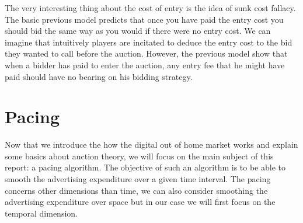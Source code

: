 \documentclass[12pt]{article}
\begin{document}
The very interesting thing about the cost of entry is the idea of sunk cost fallacy. The basic previous model predicts that once you have paid the entry cost you should bid the same way as you would if there were no entry cost. We can imagine that intuitively players are incitated to deduce the entry cost to the bid they wanted to call before the auction. However, the previous model show that when a bidder has paid to enter the auction, any entry fee that he might have paid should have no bearing on his bidding strategy.

\newpage

\section{Pacing}

Now that we introduce the how the digital out of home market works and explain some basics about auction theory, we will focus on the main subject of this report: a pacing algorithm. The objective of such an algorithm is to be able to smooth the advertising expenditure over a given time interval. The pacing concerns other dimensions than time, we can also consider smoothing the advertising expenditure over space but in our case we will first focus on the temporal dimension. \\
\end{document}
